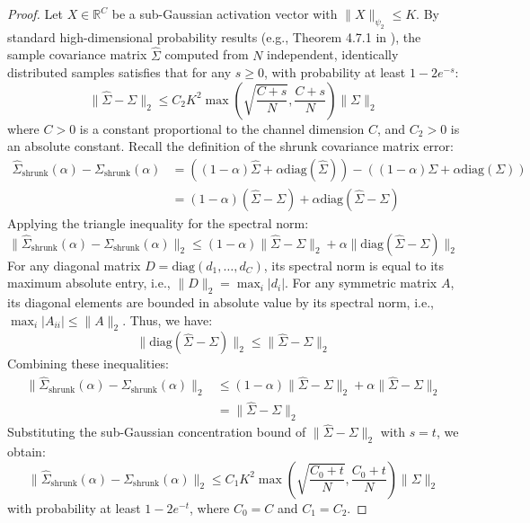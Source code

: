 \documentclass{article}
\theoremstyle{plain}
\theoremstyle{definition}
\theoremstyle{remark}
\begin{document}
\begin{proof}
Let $X \in \mathbb{R}^C$ be a sub-Gaussian activation vector with $\|X\|_{\psi_2} \leq K$. By standard high-dimensional probability results (e.g., Theorem 4.7.1 in \cite{high_dim_prob_vershynin}), the sample covariance matrix $\hat{\Sigma}$ computed from $N$ independent, identically distributed samples satisfies that for any $s \geq 0$, with probability at least $1 - 2 e^{-s}$:
\begin{equation*}
  \| \hat{\Sigma} - \Sigma \|_2 \leq C_2 K^2 \max\left( \sqrt{\frac{C + s}{N}}, \frac{C + s}{N} \right) \|\Sigma\|_2
\end{equation*}
where $C > 0$ is a constant proportional to the channel dimension $C$, and $C_2 > 0$ is an absolute constant.
Recall the definition of the shrunk covariance matrix error:
\begin{align*}
  \hat{\Sigma}_{\text{shrunk}}(\alpha) - \Sigma_{\text{shrunk}}(\alpha) &= \left( (1 - \alpha)\hat{\Sigma} + \alpha \text{diag}(\hat{\Sigma}) \right) - \left( (1 - \alpha)\Sigma + \alpha \text{diag}(\Sigma) \right) \\
  &= (1 - \alpha) (\hat{\Sigma} - \Sigma) + \alpha \text{diag}(\hat{\Sigma} - \Sigma)
\end{align*}
Applying the triangle inequality for the spectral norm:
\begin{equation*}
  \big\| \hat{\Sigma}_{\text{shrunk}}(\alpha) - \Sigma_{\text{shrunk}}(\alpha) \big\|_2 \leq (1 - \alpha) \| \hat{\Sigma} - \Sigma \|_2 + \alpha \big\| \text{diag}(\hat{\Sigma} - \Sigma) \big\|_2
\end{equation*}
For any diagonal matrix $D = \text{diag}(d_1, \dots, d_C)$, its spectral norm is equal to its maximum absolute entry, i.e., $\|D\|_2 = \max_i |d_i|$. For any symmetric matrix $A$, its diagonal elements are bounded in absolute value by its spectral norm, i.e., $\max_i |A_{ii}| \leq \|A\|_2$. Thus, we have:
\begin{equation*}
  \big\| \text{diag}(\hat{\Sigma} - \Sigma) \big\|_2 \leq \| \hat{\Sigma} - \Sigma \|_2
\end{equation*}
Combining these inequalities:
\begin{align*}
  \big\| \hat{\Sigma}_{\text{shrunk}}(\alpha) - \Sigma_{\text{shrunk}}(\alpha) \big\|_2 &\leq (1 - \alpha) \| \hat{\Sigma} - \Sigma \|_2 + \alpha \| \hat{\Sigma} - \Sigma \|_2 \\
  &= \| \hat{\Sigma} - \Sigma \|_2
\end{align*}
Substituting the sub-Gaussian concentration bound of $\|\hat{\Sigma} - \Sigma\|_2$ with $s = t$, we obtain:
\begin{equation*}
  \big\| \hat{\Sigma}_{\text{shrunk}}(\alpha) - \Sigma_{\text{shrunk}}(\alpha) \big\|_2 \leq C_1 K^2 \max\left( \sqrt{\frac{C_0 + t}{N}}, \frac{C_0 + t}{N} \right) \|\Sigma\|_2
\end{equation*}
with probability at least $1 - 2 e^{-t}$, where $C_0 = C$ and $C_1 = C_2$.


\end{proof}
\end{document}
